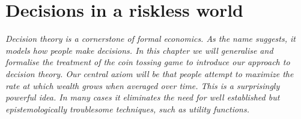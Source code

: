 \chapter{Decisions in a riskless world}
%
%


{\it Decision theory is a cornerstone of formal economics. As the name suggests, it 
models how people make decisions. In this chapter we will generalise and formalise
the treatment of the coin tossing game to introduce our 
approach to decision theory. Our central axiom will be that people attempt to maximize
the rate at which wealth grows when averaged over time. This is a surprisingly powerful idea.
In many cases it eliminates the need for well established but epistemologically troublesome techniques, such as utility functions. 
}
\newpage

